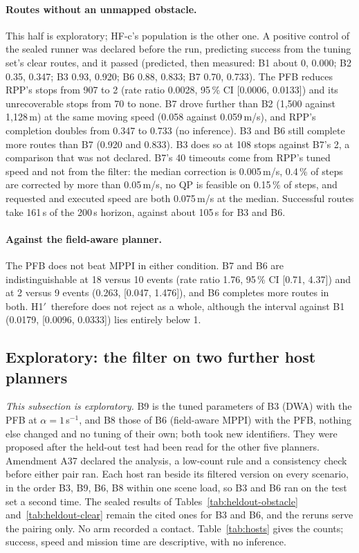 \documentclass[11pt]{article}
\newcommand{\Hprime}{H1$'$}
\theoremstyle{definition}
\begin{document}
\paragraph{Routes without an unmapped obstacle.} This half is exploratory; HF-c's population is the other one.
A positive control of the sealed runner was declared before the run, predicting success from the tuning set's
clear routes, and it passed (predicted, then measured: B1 about 0, 0.000; B2 0.35, 0.347; B3 0.93, 0.920; B6
0.88, 0.833; B7 0.70, 0.733). The PFB reduces RPP's stops from 907 to 2 (rate ratio 0.0028, 95\,\% CI [0.0006,
0.0133]) and its unrecoverable stops from 70 to none. B7 drove further than B2 (1{,}500 against 1{,}128\,m) at the
same moving speed (0.058 against 0.059\,m/s), and RPP's completion doubles from 0.347 to 0.733 (no inference). B3 and
B6 still complete more routes than B7 (0.920 and 0.833). B3 does so at 108 stops against B7's 2, a comparison that was
not declared. B7's 40 timeouts come from RPP's tuned speed and not from the filter: the median correction is
0.005\,m/s, 0.4\,\% of steps are corrected by more than 0.05\,m/s, no QP is feasible on 0.15\,\% of steps, and
requested and executed speed are both 0.075\,m/s at the median. Successful routes take 161\,s of the 200\,s horizon,
against about 105\,s for B3 and B6.

\paragraph{Against the field-aware planner.} The PFB does not beat MPPI in either condition. B7 and B6 are
indistinguishable at 18 versus 10 events (rate ratio 1.76, 95\,\% CI [0.71, 4.37]) and at 2 versus 9 events (0.263,
[0.047, 1.476]), and B6 completes more routes in both. \Hprime\ therefore does not reject as a whole, although the interval against B1 (0.0179, [0.0096, 0.0333]) lies entirely below 1.

\subsection{Exploratory: the filter on two further host planners}\label{sec:res-hosts}
\emph{This subsection is exploratory.} B9 is the tuned parameters of B3 (DWA) with the PFB at $\alpha=1$\,s$^{-1}$, and B8
those of B6 (field-aware MPPI) with the PFB, nothing else changed and no tuning of their own; both took new
identifiers. They were proposed after the held-out test had been read for the other five planners. Amendment A37 declared
the analysis, a low-count rule and a consistency check before either pair ran. Each host ran beside its filtered version on
every scenario, in the order B3, B9, B6, B8 within one scene load, so B3 and B6 ran on the test set a second time. The sealed
results of Tables~\ref{tab:heldout-obstacle} and~\ref{tab:heldout-clear} remain the cited ones for B3 and B6, and the reruns
serve the pairing only. No arm recorded a contact. Table~\ref{tab:hosts} gives the counts; success, speed and mission time
are descriptive, with no inference.
\end{document}
